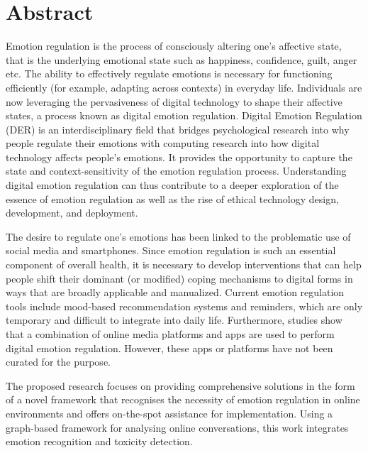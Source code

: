 \section*{Abstract}
Emotion regulation is the process of consciously altering one's affective state, that is the underlying emotional state such as happiness, confidence, guilt, anger etc. The ability to effectively regulate emotions is necessary for functioning efficiently (for example, adapting across contexts) in everyday life. Individuals are now leveraging the pervasiveness of digital technology to shape their affective states, a process known as digital emotion regulation. Digital Emotion Regulation (DER) is an interdisciplinary field that bridges psychological research into why people regulate their emotions with computing research into how digital technology affects people's emotions. It provides the opportunity to capture the state and context-sensitivity of the emotion regulation process. Understanding digital emotion regulation can thus contribute to a deeper exploration of the essence of emotion regulation as well as the rise of ethical technology design, development, and deployment. 

The desire to regulate one's emotions has been linked to the problematic use of social media and smartphones. Since emotion regulation is such an essential component of overall health, it is necessary to develop interventions that can help people shift their dominant (or modified) coping mechanisms to digital forms in ways that are broadly applicable and manualized. Current emotion regulation tools include mood-based recommendation systems and reminders, which are only temporary and difficult to integrate into daily life. Furthermore, studies show that a combination of online media platforms and apps are used to perform digital emotion regulation. However, these apps or platforms have not been curated for the purpose.

The proposed research focuses on providing comprehensive solutions in the form of a novel framework that recognises the necessity of emotion regulation in online environments and offers on-the-spot assistance for implementation. Using a graph-based framework for analysing online conversations, this work integrates emotion recognition and toxicity detection.